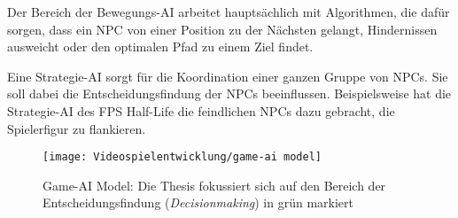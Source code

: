 Der Bereich der Bewegungs-AI arbeitet haupts\"{a}chlich mit Algorithmen, die daf\"{u}r sorgen, dass ein NPC von einer Position zu der N\"{a}chsten gelangt, Hindernissen ausweicht oder den optimalen Pfad zu einem Ziel findet.

Eine Strategie-AI sorgt f\"{u}r die Koordination einer ganzen Gruppe von NPCs. Sie soll dabei die Entscheidungsfindung der NPCs beeinflussen. Beispielsweise hat die Strategie-AI des FPS Half-Life die feindlichen NPCs dazu gebracht, die Spielerfigur zu flankieren.

\begin{figure}[h]
  \centering
  \texttt{[image: Videospielentwicklung/game-ai model]}
	\captionsetup{justification=justified, format=plain}
  \caption{Game-AI Model: Die Thesis fokussiert sich auf den Bereich der Entscheidungsfindung (\textit{Decisionmaking}) in gr\"{u}n markiert}
  \label{fig:game-ai model}
\end{figure}